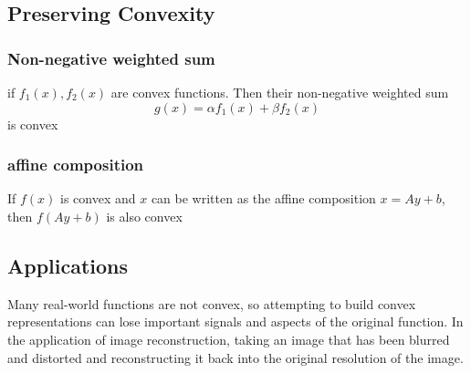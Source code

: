 \subsection{Preserving Convexity}
\subsubsection{Non-negative weighted sum}
if $f_1(x), f_2(x)$ are convex functions. Then their non-negative weighted sum 
\begin{equation}
  g(x) = \alpha f_1(x) + \beta f_2(x)
\end{equation}
is convex
\subsubsection{affine composition}
If $f(x)$ is convex and $x$ can be written as the affine composition $x=Ay +b$, then $f(Ay+b)$ is also convex

\subsection{Applications}
Many real-world functions are not convex, so attempting to build convex representations can lose important signals and aspects of the original function. In the application of image reconstruction, taking an image that has been blurred and distorted and reconstructing it back into the original resolution of the image.
